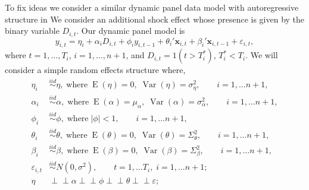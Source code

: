 \documentclass[11pt]{article}
\newcommand{\x}{\textbf{x}}
\newcommand{\indep}{\perp\!\!\!\perp}
\DeclareMathOperator{\E}{E}
\DeclareMathOperator{\Var}{Var}
\begin{document}
To fix ideas we consider a similar dynamic panel data model with autoregressive 
structure in \citet{blundell1998initial} %
We consider an additional shock effect whose presence is given by the binary 
variable $D_{i,t}$.  Our dynamic panel model is  
\begin{equation} \label{DPM}
  y_{i,t} = \eta_i + \alpha_iD_{i,t} + \phi_i y_{i,t-1} + \theta_i' \x_{i,t} + 
    \beta_i' \x_{i,t-1} + \varepsilon_{i,t},  
\end{equation}
where $t = 1,\ldots,T_i$, $i = 1,\ldots, n+1$, and $D_{i,t} = 1(t > T_i^*)$, 
$T_i^* < T_i$.  We will consider a simple random effects structure where,  
\begin{align*}
  \eta_i &\overset{iid}{\sim} \eta,\; \text{where}\; \E(\eta) = 0,\; \Var(\eta) = \sigma_\eta^2, 
    \qquad i = 1,\ldots n+1, \\
  \alpha_i &\overset{iid}{\sim} \alpha,\; \text{where}\; \E(\alpha) = \mu_\alpha,\; 
    \Var(\alpha) = \sigma_\alpha^2, \qquad i = 1,\ldots n+1, \\
  \phi_i &\overset{iid}{\sim} \phi,\; \text{where}\; |\phi| < 1, 
    \qquad i = 1,\ldots n+1, \\
  \theta_i &\overset{iid}{\sim} \theta,\; \text{where}\; \E(\theta) = 0,\; 
    \Var(\theta) = \Sigma_\theta^2, \qquad i = 1,\ldots n+1, \\
  \beta_i &\overset{iid}{\sim} \beta,\; \text{where}\; \E(\beta) = 0,\; 
    \Var(\beta) = \Sigma_\beta^2, \qquad i = 1,\ldots n+1, \\    
  \varepsilon_{i,t} &\overset{iid}{\sim} N(0, \sigma^2), 
    \qquad t = 1, \ldots T_i,\; i = 1,\ldots n+1; \\
  \eta &\indep \alpha \indep \phi \indep \theta \indep \varepsilon;
\end{align*}
\end{document}

